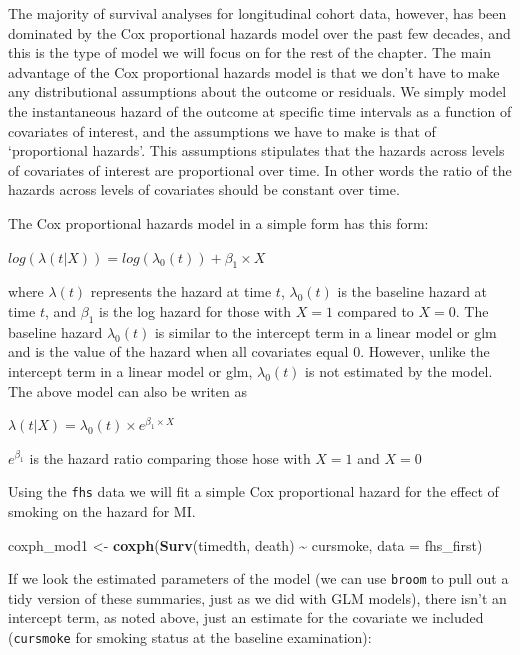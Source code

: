 \documentclass[
]{book}
\newenvironment{Shaded}{\begin{snugshade}}{\end{snugshade}}
\newcommand{\AttributeTok}[1]{\textcolor[rgb]{0.13,0.29,0.53}{#1}}
\newcommand{\FunctionTok}[1]{\textcolor[rgb]{0.13,0.29,0.53}{\textbf{#1}}}
\newcommand{\NormalTok}[1]{#1}
\newcommand{\OtherTok}[1]{\textcolor[rgb]{0.56,0.35,0.01}{#1}}
\newcommand{\SpecialCharTok}[1]{\textcolor[rgb]{0.81,0.36,0.00}{\textbf{#1}}}
\begin{document}
The majority of survival analyses for longitudinal cohort data, however, has been dominated by the Cox proportional hazards model over the past few decades, and this is the type of model we will focus on for the rest of the chapter. The main advantage of the Cox proportional hazards model is that we don't have to make any distributional assumptions about the outcome or residuals. We simply model the instantaneous hazard of the outcome at specific time intervals as a function of covariates of interest, and the assumptions we have to make is that of `proportional hazards'. This assumptions stipulates that the hazards across levels of covariates of interest are proportional over time. In other words the ratio of the hazards across levels of covariates should be constant over time.

The Cox proportional hazards model in a simple form has this form:

\(log(\lambda(t|X))=log(\lambda_{0}(t))+\beta_{1}\times X\)

where \(\lambda(t)\) represents the hazard at time \(t\), \(\lambda_{0}(t)\) is the baseline hazard at time \(t\), and \(\beta_{1}\) is the log hazard for those with \(X=1\) compared to \(X=0\). The baseline hazard \(\lambda_{0}(t)\) is similar to the intercept term in a linear model or glm and is the value of the hazard when all covariates equal 0. However, unlike the intercept term in a linear model or glm, \(\lambda_{0}(t)\) is not estimated by the model.
The above model can also be writen as

\(\lambda(t|X)=\lambda_{0}(t)\times e^{\beta_{1}\times X}\)

\(e^{\beta_{1}}\) is the hazard ratio comparing those hose with \(X=1\) and \(X=0\)

Using the \texttt{fhs} data we will fit a simple Cox proportional hazard for the effect of smoking on the hazard for MI.

\begin{Shaded}
\begin{Highlighting}[]
\NormalTok{coxph\_mod1 }\OtherTok{\textless{}{-}} \FunctionTok{coxph}\NormalTok{(}\FunctionTok{Surv}\NormalTok{(timedth, death) }\SpecialCharTok{\textasciitilde{}}\NormalTok{ cursmoke, }\AttributeTok{data =}\NormalTok{ fhs\_first)}
\end{Highlighting}
\end{Shaded}

If we look the estimated parameters of the model (we can use \texttt{broom} to pull out a tidy version of these summaries, just as we did with GLM models), there isn't an intercept term, as noted above, just an estimate for the covariate we included (\texttt{cursmoke} for smoking status at the baseline examination):
\end{document}
